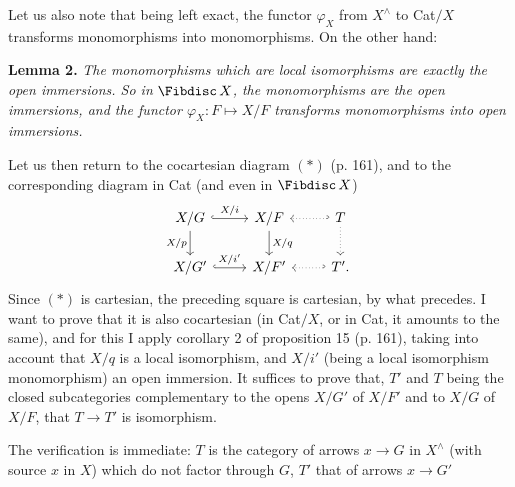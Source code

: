Let us also note that being left exact, the functor $\varphi_X$ from $X^{\wedge}$ to Cat$/X$ transforms monomorphisms into monomorphisms. On the other hand:

\textbf{Lemma 2.} \textit{The monomorphisms which are local isomorphisms are exactly the open immersions. So in} $\Fibdisc\, X$\textit{, the monomorphisms are the open immersions, and the functor $\varphi_X : F \longmapsto X/F$ transforms monomorphisms into open immersions.}

Let us then return to the cocartesian diagram $(*)$ (p. 161), and to the corresponding diagram in Cat (and even in $\Fibdisc\, X$)
\[
\begin{tikzcd}
X/G \ar[r, hook, "X/i"] \ar[d, "X/p"'] & X/F \ar[d, "X/q"] & T \ar[l, hook', dotted] \ar[d, dotted] \\
X/G' \ar[r, hook, "X/i'"] & X/F' & T'. \ar[l, hook', dotted]
\end{tikzcd}
\]
Since $(*)$ is cartesian, the preceding square is cartesian, by what precedes. I want to prove that it is also cocartesian
(in Cat$/X$, or in Cat, it amounts to the same), and for this I apply corollary 2 of proposition 15 (p. 161), taking into account that $X/q$ is a local isomorphism, and $X/i'$ (being a local isomorphism monomorphism) an open immersion. It suffices to prove that, $T'$ and $T$ being the closed subcategories complementary to the opens $X/G'$ of $X/F'$ and to $X/G$ of $X/F$, that $T \longrightarrow T'$ is isomorphism.

{\small} %

The verification is immediate: $T$ is the category of arrows $x \longrightarrow G$ in $X^{\wedge}$ (with source $x$ in $X$) which do not factor through $G$, $T'$ that of arrows $x \longrightarrow G'$
